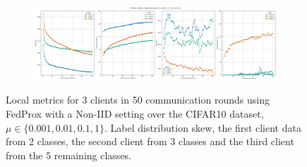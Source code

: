 \begin{figure}[H]
    \begin{subfigure}{\linewidth}
        \centering
        \includegraphics[width=0.8\linewidth]{figures/2-Federated_Learning/FedProx_LabelsPerParty_mu_1.png}
    \end{subfigure}

    \caption{Local metrics for 3 clients in 50 communication rounds using FedProx with a Non-IID setting over the CIFAR10 dataset, $\mu \in \{0.001, 0.01, 0.1, 1\}$.  Label distribution skew, the first client data from 2 classes, the second client
from 3 classes and the third client from the 5 remaining classes.}
    \label{fig:FedProx_Non_IID_LabelsPerParty}
\end{figure}




